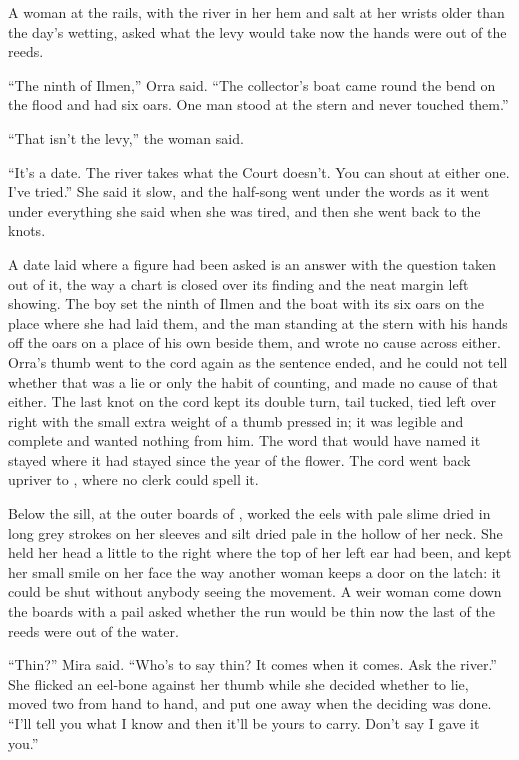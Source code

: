 A woman at the rails, with the river in her hem and salt at her wrists older than the day's wetting, asked what the levy would take now the hands were out of the reeds.

“The ninth of Ilmen,” Orra said. “The collector's boat came round the bend on the flood and had six oars. One man stood at the stern and never touched them.”

“That isn't the levy,” the woman said.

“It's a date. The river takes what the Court doesn't. You can shout at either one. I've tried.” She said it slow, and the half-song went under the words as it went under everything she said when she was tired, and then she went back to the knots.

A date laid where a figure had been asked is an answer with the question taken out of it, the way a chart is closed over its finding and the neat margin left showing. The boy set the ninth of Ilmen and the boat with its six oars on the place where she had laid them, and the man standing at the stern with his hands off the oars on a place of his own beside them, and wrote no cause across either. Orra's thumb went to the cord again as the sentence ended, and he could not tell whether that was a lie or only the habit of counting, and made no cause of that either. The last knot on the cord kept its double turn, tail tucked, tied left over right with the small extra weight of a thumb pressed in; it was legible and complete and wanted nothing from him. The word that would have named it stayed where it had stayed since the year of the flower. The cord went back upriver to , where no clerk could spell it.

\scenebreak

Below the sill, at the outer boards of ,  worked the eels with pale slime dried in long grey strokes on her sleeves and silt dried pale in the hollow of her neck. She held her head a little to the right where the top of her left ear had been, and kept her small smile on her face the way another woman keeps a door on the latch: it could be shut without anybody seeing the movement. A weir woman come down the boards with a pail asked whether the run would be thin now the last of the reeds were out of the water.

“Thin?” Mira said. “Who's to say thin? It comes when it comes. Ask the river.” She flicked an eel-bone against her thumb while she decided whether to lie, moved two from hand to hand, and put one away when the deciding was done. “I'll tell you what I know and then it'll be yours to carry. Don't say I gave it you.”

